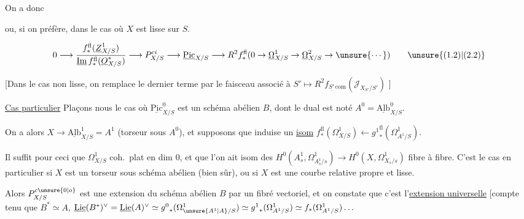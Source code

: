 
On a donc


ou, si on préfère, dans le cas où $X$ est lisse sur $S$.

\[
0\longrightarrow\frac{f_*^{\mathrm{fl}}(\underline{Z}^1_{X/S})}{\underline{\mathrm{Im}}\,f_*^{\mathrm{fl}}(\underline O^*_{X/S})}
\longrightarrow P^{ci}_{X/S}\longrightarrow\underline{\mathrm{Pic}}_{X/S}
\longrightarrow R^{2}f_*^{\mathrm{fl}}(0\to\underline\Omega^1_{X/S}\to\underline\Omega^2_{X/S}\to\unsure{\cdots})
\tag*{\unsure{(1.2)|(2.2)}}
\]

[Dans le cas non lisse, on remplace le dernier terme par  le faisceau associé à $S'\longmapsto R^2 f_{\underline{S'}\,\mathrm{com}}(\mathscr J_{X_{S'}/S'})$ ]


\uline{Cas particulier} Plaçons nous  le cas où $\underline{\mathrm{Pic}}^0_{X/S}$ est un schéma abélien $B$, dont le dual est noté $A^0=\underline{\mathrm{Alb}}^0_{X/S}$.

On a alors $X\to\underline{\mathrm{Alb}}^1_{X/S}=A^1$ (torseur sous $A^0$), et supposons que
induise un \uline{isom} $f_*^{\mathrm{fl}}(\Omega^1_{X/S})\longleftarrow {g^1}_*^{\mathrm{fl}}(\Omega^1_{A^1/S})$.

Il suffit pour ceci que  $\Omega^1_{X/S}$   coh.\ plat en dim 0, et que l'on ait isom des $H^0(A^1_s,\Omega^1_{A^1_s/s})\to H^0(X,\Omega^1_{X_s/s})$ fibre à fibre. C'est le cas en particulier si $X$ est un torseur sous schéma abélien (bien sûr), ou si $X$ est une courbe relative propre et lisse.

Alors $P^{c\unsure{0|o}}_{X/S}$  est une extension du schéma abélien $B$ par un fibré vectoriel, et on constate que c'est l'\uline{extension universelle} [compte tenu que $B^*\simeq A$,  $\underline{\mathrm{Lie}}(B^*)^\vee=\underline{\mathrm{Lie}}(A)^\vee\simeq {g^0}_*(\Omega^1_{\unsure{A^1|A}/S})\simeq {g^1}_*(\Omega^1_{A^1/S})\simeq f_*(\Omega^1_{A^1/S})\ldots$

